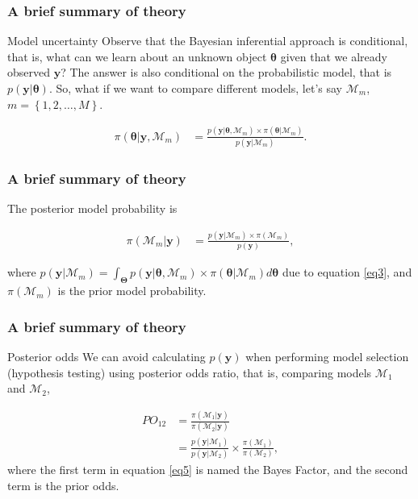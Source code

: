 \documentclass[12pt, compress]{beamer}
\begin{document}
\begin{frame}
	\frametitle{A brief summary of theory}
	\begin{block}{Model uncertainty}
		Observe that the Bayesian inferential approach is conditional, that is, what can we learn about an unknown object $\boldsymbol{\theta}$ given that we already observed $\boldsymbol{y}$? The answer is also conditional on the probabilistic model, that is $p(\boldsymbol{y}|\boldsymbol{\theta})$. So, what if we want to compare different models, let's say $\mathcal{M}_m$, $m=\left\{1,2,\dots,M\right\}$.
	\end{block}
	
	\begin{align}\label{eq3}
	\pi(\boldsymbol{\theta}|\boldsymbol{y},\mathcal{M}_m)&=\frac{p(\boldsymbol{y}|\boldsymbol{\theta},\mathcal{M}_m) \times \pi(\boldsymbol{\theta}|\mathcal{M}_m)}{p(\boldsymbol{y}|\mathcal{M}_m)}.
	\end{align} 	
\end{frame}

\begin{frame}
	\frametitle{A brief summary of theory}
The posterior model probability is

\begin{align}
\pi(\mathcal{M}_m|\boldsymbol{y})&=\frac{p(\boldsymbol{y}|\mathcal{M}_m) \times \pi(\mathcal{M}_m)}{p(\boldsymbol{y})}, 
\end{align}

where $p(\boldsymbol{y}|\mathcal{M}_m)=\int_{\boldsymbol{\Theta}}p(\boldsymbol{y}|\boldsymbol{\theta},\mathcal{M}_m) \times \pi(\boldsymbol{\theta}|\mathcal{M}_m)d\boldsymbol{\theta}$ due to equation \ref{eq3}, and $\pi(\mathcal{M}_m)$ is the prior model probability. 
 	
\end{frame}

\begin{frame}
	\frametitle{A brief summary of theory}
	
	\begin{block}{Posterior odds}
	We can avoid calculating $p(\boldsymbol{y})$ when performing model selection (hypothesis testing) using posterior odds ratio, that is, comparing models $\mathcal{M}_1$ and $\mathcal{M}_2$,
	\end{block}

	\begin{align}\label{eq5}
	PO_{12}&=\frac{\pi(\mathcal{M}_1|\boldsymbol{y})}{\pi(\mathcal{M}_2|\boldsymbol{y})}\nonumber \\
	&=\frac{p(\boldsymbol{y}|\mathcal{M}_1)}{p(\boldsymbol{y}|\mathcal{M}_2)}\times\frac{\pi(\mathcal{M}_1)}{\pi(\mathcal{M}_2)},
	\end{align} 
	where the first term in equation \ref{eq5} is named the Bayes Factor, and the second term is the prior odds.
	
\end{frame}
\end{document}
